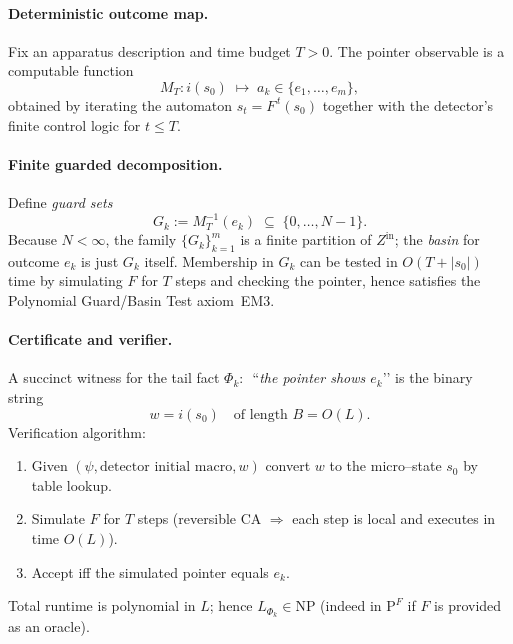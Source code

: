 \documentclass[12pt]{article}
\theoremstyle{definition}
\theoremstyle{plain}
\begin{document}
\paragraph{Deterministic outcome map.}
Fix an apparatus description and time budget $T\!>\!0$.  The pointer
observable is a computable function
\[
    M_T : i(s_0) \;\longmapsto\; a_k \in \{e_1,\dots,e_m\},
\]
obtained by iterating the automaton
$s_t=F^{\,t}(s_0)$ together with the
detector’s finite control logic for $t\le T$.

\paragraph{Finite guarded decomposition.}
Define \emph{guard sets}
\[
    G_k := M_T^{-1}(e_k) \;\subseteq\; \{0,\dots,N-1\}.
\]
Because $N<\infty$, the family $\{G_k\}_{k=1}^{m}$ is a finite
partition of $Z^{\mathrm{in}}$; the \emph{basin} for outcome $e_k$ is
just $G_k$ itself.  Membership in $G_k$ can be tested in
$O(T+|s_0|)$ time by simulating $F$ for $T$ steps and checking the
pointer, hence satisfies the Polynomial Guard/Basin Test axiom~EM3.

\paragraph{Certificate and verifier.}
A succinct witness for the tail fact
$\Phi_k\!\!:\,$ “\emph{the pointer shows $e_k$}’’ is the binary string
\[
     w = i(s_0)\quad\text{of length }B=O(L).
\]
Verification algorithm:

\begin{enumerate}[leftmargin=15pt,itemsep=2pt]
 \item Given $(\psi,\text{detector initial macro}, w)$ convert $w$ to
       the micro–state $s_0$ by table lookup.
 \item Simulate $F$ for $T$ steps (reversible CA $\Rightarrow$ each step is local
       and executes in time $O(L)$).
 \item Accept iff the simulated pointer equals $e_k$.
\end{enumerate}

Total runtime is polynomial in $L$; hence
$L_{\Phi_k}\in\mathrm{NP}$ (indeed in
$\mathrm{P}^{F\!}$ if $F$ is provided as an oracle).

\end{document}
